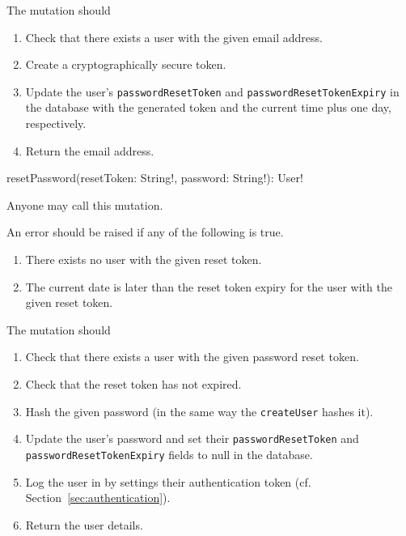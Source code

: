 \functionality

The mutation should

\begin{enumerate}
    \item Check that there exists a user with the given email address.
    \item Create a cryptographically secure token.
    \item Update the user's \verb|passwordResetToken| and \verb|passwordResetTokenExpiry| in the database with the generated token and the current time plus one day, respectively.
    \item Return the email address.
\end{enumerate}


\begin{code}
resetPassword(resetToken: String!, password: String!): User!
\end{code}

\restrictions

Anyone may call this mutation.

\errors

An error should be raised if any of the following is true.

\begin{enumerate}
    \item There exists no user with the given reset token.
    \item The current date is later than the reset token expiry for the user with the given reset token.
\end{enumerate}

\functionality

The mutation should

\begin{enumerate}
    \item Check that there exists a user with the given password reset token.
    \item Check that the reset token has not expired.
    \item Hash the given password (in the same way the \verb|createUser| hashes it).
    \item Update the user's password and set their \verb|passwordResetToken| and \verb|passwordResetTokenExpiry| fields to null in the database.
    \item Log the user in by settings their authentication token (cf. Section~\ref{sec:authentication}).
    \item Return the user details.
\end{enumerate}

